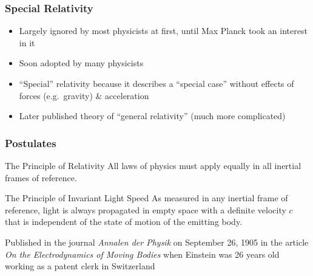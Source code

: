 \documentclass[12pt,compress,aspectratio=169]{beamer}
\begin{document}
\begin{frame}
  \frametitle{Special Relativity}
  \begin{itemize}
  \item Largely ignored by most physicists at first, until Max Planck took an
    interest in it
  \item Soon adopted by many physicists
  \item ``Special'' relativity because it describes a ``special case'' without
    effects of forces (e.g.\ gravity) \& acceleration
  \item Later published theory of ``general relativity'' (much more complicated)
  \end{itemize}
\end{frame}



\begin{frame}
  \frametitle{Postulates}
  \begin{block}{The Principle of Relativity}
    All laws of physics must apply equally in all inertial frames of reference.
  \end{block}

  \begin{block}{The Principle of Invariant Light Speed}
    As measured in any inertial frame of reference, light is always propagated
    in empty space with a definite velocity $c$ that is independent of the
    state of motion of the emitting body.
  \end{block}

  \vspace{.15in}Published in the journal \emph{Annalen der Physik} on September
  26, 1905 in the article \emph{On the Electrodynamics of Moving Bodies} when
  Einstein was 26 years old working as a patent clerk in Switzerland
\end{frame}
\end{document}
